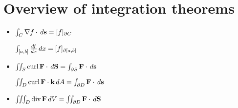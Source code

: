 \documentclass[11pt]{article}
\begin{document}
\section*{Overview of integration theorems}

\begin{itemize}
  \item \(\int_C \nabla f\cdot\,d \mathbf{s}=[f]_{\partial C}\)

        \(\int_{[a,b]} \frac{df}{dx}\,d x =[f]_{\partial [a,b]}\)
  \item \(\iint_S \textrm{curl}\, \mathbf{F}\cdot\,d \mathbf{S}=\int_{\partial S} \mathbf{F}\cdot\,d\mathbf{s} \)

        \(\iint_D \textrm{curl}\, \mathbf{F}\cdot\mathbf{k}\,d A=\int_{\partial D} \mathbf{F}\cdot\,d\mathbf{s} \)
  \item \(\iiint_D \textrm{div}\, \mathbf{F}\,d V=\iint_{\partial D} \mathbf{F}\cdot\,d \mathbf{S} \)
\end{itemize}




\end{document}
